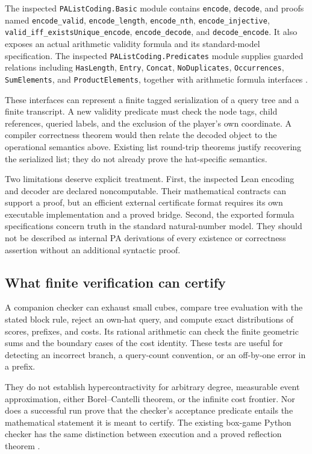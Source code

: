\documentclass[11pt,letterpaper]{article}
\theoremstyle{definition}
\begin{document}
The inspected \nolinkurl{PAListCoding.Basic} module contains \nolinkurl{encode},
\nolinkurl{decode}, and proofs named \nolinkurl{encode_valid},
\nolinkurl{encode_length}, \nolinkurl{encode_nth},
\nolinkurl{encode_injective},
\nolinkurl{valid_iff_existsUnique_encode},
\nolinkurl{encode_decode}, and \nolinkurl{decode_encode}.
It also exposes an actual arithmetic validity formula and its standard-model
specification.  The inspected \nolinkurl{PAListCoding.Predicates} module supplies
guarded relations including \nolinkurl{HasLength}, \nolinkurl{Entry},
\nolinkurl{Concat}, \nolinkurl{NoDuplicates}, \nolinkurl{Occurrences},
\nolinkurl{SumElements}, and \nolinkurl{ProductElements}, together with arithmetic
formula interfaces \cite{qry:ListCoding}.

These interfaces can represent a finite tagged serialization of a query tree
and a finite transcript.  A new validity predicate must check the node tags,
child references, queried labels, and the exclusion of the player's own
coordinate.  A compiler correctness theorem would then relate the decoded
object to the operational semantics above.  Existing list round-trip
theorems justify recovering the serialized list; they do not already prove
the hat-specific semantics.

Two limitations deserve explicit treatment.  First, the inspected Lean
encoding and decoder are declared noncomputable.  Their mathematical
contracts can support a proof, but an efficient external certificate format
requires its own executable implementation and a proved bridge.  Second, the
exported formula specifications concern truth in the standard natural-number
model.  They should not be described as internal PA derivations of every
existence or correctness assertion without an additional syntactic proof.

\subsection{What finite verification can certify}

A companion checker can exhaust small cubes, compare tree evaluation with the
stated block rule, reject an own-hat query, and compute exact distributions
of scores, prefixes, and costs.  Its rational arithmetic can check the finite
geometric sums and the boundary cases of the cost identity.  These tests are
useful for detecting an incorrect branch, a query-count convention, or an
off-by-one error in a prefix.

They do not establish hypercontractivity for arbitrary degree, measurable
event approximation, either Borel--Cantelli theorem, or the infinite cost
frontier.  Nor does a successful run prove that the checker's acceptance
predicate entails the mathematical statement it is meant to certify.
The existing box-game Python checker has the same distinction between
execution and a proved reflection theorem \cite{qry:RepoBoxes}.
\end{document}
